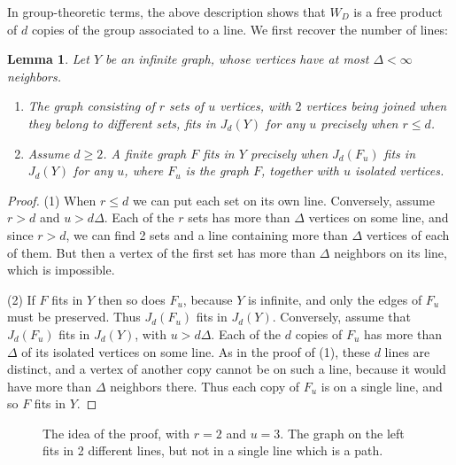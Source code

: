 \documentclass[11pt,a4paper]{article}
\newtheorem{lem}[thm]{Lemma}
\begin{document}
In group-theoretic terms, the above description shows that $W_D$ is a free product of $d$ copies of the group associated to a line. We first recover the number of lines:

\begin{lem}\label{lines}
Let $Y$ be an infinite graph, whose vertices have at most $\Delta<\infty$ neighbors.
\begin{enumerate}
\item The graph consisting of $r$ sets of $u$ vertices, with $2$ vertices being joined when they belong to different sets, fits in $J_d(Y)$ for any $u$ precisely when $r\leq d$.

\item Assume $d\geq2$. A finite graph $F$ fits in $Y$ precisely when $J_d(F_u)$ fits in $J_d(Y)$ for any $u$, where $F_u$ is the graph $F$, together with $u$ isolated vertices.
\end{enumerate}
\end{lem}

\begin{proof}
(1) When $r\leq d$ we can put each set on its own line. Conversely, assume $r>d$ and $u>d\Delta$. Each of the $r$ sets has more than $\Delta$ vertices on some line, and since $r>d$, we can find 2 sets and a line containing more than $\Delta$ vertices of each of them. But then a vertex of the first set has more than $\Delta$ neighbors on its line, which is impossible.

(2) If $F$ fits in $Y$ then so does $F_u$, because $Y$ is infinite, and only the edges of $F_u$ must be preserved. Thus $J_d(F_u)$ fits in $J_d(Y)$. Conversely, assume that $J_d(F_u)$ fits in $J_d(Y)$, with $u>d\Delta$. Each of the $d$ copies of $F_u$ has more than $\Delta$ of its isolated vertices on some line. As in the proof of (1), these $d$ lines are distinct, and a vertex of another copy cannot be on such a line, because it would have more than $\Delta$ neighbors there. Thus each copy of $F_u$ is on a single line, and so $F$ fits in $Y$.
\end{proof}

\begin{figure}[H]\centering
{}
\caption{The idea of the proof, with $r=2$ and $u=3$. The graph on the left fits in 2 different lines, but not in a single line which is a path.}
\label{line-count}
\end{figure}
\end{document}
